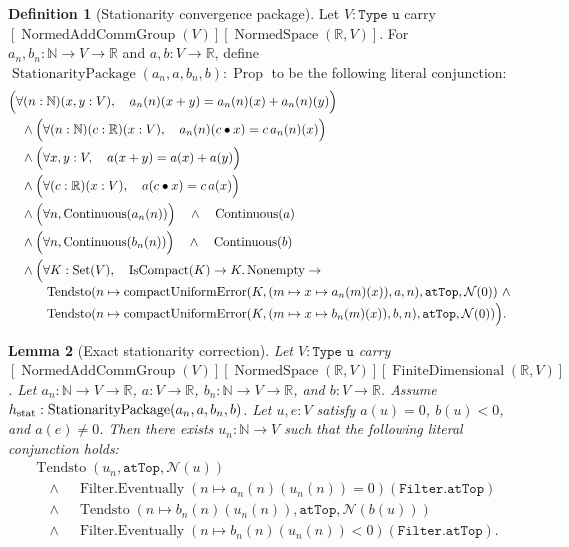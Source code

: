 \documentclass[9pt]{extarticle}
\newtheorem{lemma}{Lemma}[section]
\theoremstyle{definition}
\newtheorem{definition}[lemma]{Definition}
\theoremstyle{remark}
\newcommand{\R}{\mathbb R}
\newcommand{\N}{\mathbb N}
\begin{document}
\begin{definition}[Stationarity convergence package]
\label{def:stationarity-package}
Let $V:\texttt{Type u}$ carry
$[\operatorname{NormedAddCommGroup}(V)]
 [\operatorname{NormedSpace}(\R,V)]$.
For $a_n,b_n:\N\to V\to\R$ and $a,b:V\to\R$, define
$\operatorname{StationarityPackage}(a_n,a,b_n,b):\operatorname{Prop}$ to
be the following literal conjunction:
\begin{align*}
&\Bigl(\forall(n:\N)(x,y:V),\quad
  a_n(n)(x+y)=a_n(n)(x)+a_n(n)(y)\Bigr)\\
&\quad\wedge\Bigl(\forall(n:\N)(c:\R)(x:V),\quad
  a_n(n)(c\mathbin{\bullet}x)=c\,a_n(n)(x)\Bigr)\\
&\quad\wedge\Bigl(\forall x,y:V,\quad a(x+y)=a(x)+a(y)\Bigr)\\
&\quad\wedge\Bigl(\forall(c:\R)(x:V),\quad
  a(c\mathbin{\bullet}x)=c\,a(x)\Bigr)\\
&\quad\wedge\Bigl(\forall n,\operatorname{Continuous}(a_n(n))\Bigr)
 \quad\wedge\quad\operatorname{Continuous}(a)\\
&\quad\wedge\Bigl(\forall n,\operatorname{Continuous}(b_n(n))\Bigr)
 \quad\wedge\quad\operatorname{Continuous}(b)\\
&\quad\wedge\Bigl(\forall K:\operatorname{Set}(V),\quad
 \operatorname{IsCompact}(K)\to K.\operatorname{Nonempty}\to\\[-2pt]
&\hspace{10mm}
 \operatorname{Tendsto}
  (n\mapsto\operatorname{compactUniformError}
    (K,(m\mapsto x\mapsto a_n(m)(x)),a,n),
   \texttt{atTop},\mathcal N(0))\ \wedge\\[-2pt]
&\hspace{10mm}
 \operatorname{Tendsto}
  (n\mapsto\operatorname{compactUniformError}
    (K,(m\mapsto x\mapsto b_n(m)(x)),b,n),
   \texttt{atTop},\mathcal N(0))\Bigr).
\end{align*}
\end{definition}

\begin{lemma}[Exact stationarity correction]\label{lem:stationarity-correction}
Let $V:\texttt{Type u}$ carry
$[\operatorname{NormedAddCommGroup}(V)]
 [\operatorname{NormedSpace}(\R,V)]
 [\operatorname{FiniteDimensional}(\R,V)]$.
Let
$a_n:\N\to V\to\R$, $a:V\to\R$,
$b_n:\N\to V\to\R$, and $b:V\to\R$.  Assume
$h_{\rm stat}:\operatorname{StationarityPackage}(a_n,a,b_n,b)$.
Let $u,e:V$ satisfy $a(u)=0$, $b(u)<0$, and $a(e)\neq0$.  Then there exists
$u_n:\N\to V$ such that the following literal conjunction holds:
\begin{align*}
 &\operatorname{Tendsto}(u_n,\texttt{atTop},\mathcal N(u))\\
 &\quad\wedge\quad
 \operatorname{Filter.Eventually}
  (n\mapsto a_n(n)(u_n(n))=0)(\texttt{Filter.atTop})\\
 &\quad\wedge\quad
 \operatorname{Tendsto}(n\mapsto b_n(n)(u_n(n)),
    \texttt{atTop},\mathcal N(b(u)))\\
 &\quad\wedge\quad
 \operatorname{Filter.Eventually}
  (n\mapsto b_n(n)(u_n(n))<0)(\texttt{Filter.atTop}).
\end{align*}
\end{lemma}
\end{document}
